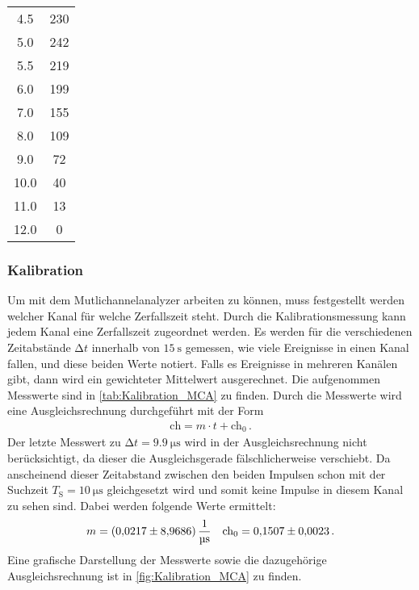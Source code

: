 \begin{table}[h]
\begin{tabular}{S[table-format=2.1] c}
        4.5   &      230\\
        5.0   &      242\\
        5.5   &      219\\
        6.0   &      199\\
        7.0   &      155\\
        8.0   &      109\\
        9.0   &      72 \\
        10.0  &      40 \\
        11.0  &      13 \\
        12.0  &      0  \\
        \bottomrule
      \end{tabular}
    \end{table}
  
  \subsubsection{Kalibration}
  Um mit dem Mutlichannelanalyzer arbeiten zu können, muss festgestellt werden welcher Kanal für welche Zerfallszeit steht.
  Durch die Kalibrationsmessung kann jedem Kanal eine Zerfallszeit zugeordnet werden. Es werden für die verschiedenen Zeitabstände $\increment t$
  innerhalb von $\SI{15}{\second}$ gemessen, wie viele Ereignisse in einen Kanal fallen, und diese beiden Werte notiert. Falls es Ereignisse in mehreren 
  Kanälen gibt, dann wird ein gewichteter Mittelwert ausgerechnet. 
  Die aufgenommen Messwerte sind in \autoref{tab:Kalibration_MCA} zu finden.
  Durch die Messwerte wird eine Ausgleichsrechnung durchgeführt mit der Form
  \begin{align*}
    \text{ch} = m \cdot t + \text{ch}_0 \, .
  \end{align*}
  Der letzte Messwert zu $\increment t = \SI{9.9}{\micro\second}$ wird in der Ausgleichsrechnung nicht berücksichtigt, da dieser die Ausgleichsgerade fälschlicherweise verschiebt.
  Da anscheinend dieser Zeitabstand zwischen den beiden Impulsen schon mit der Suchzeit $T_\text{S} = \SI{10}{\micro\second}$ gleichgesetzt wird und somit keine Impulse in diesem Kanal zu sehen sind.
  Dabei werden folgende Werte ermittelt:
  \begin{align*}
    m = \SI{0.0217 \pm 8.9686}{\per\micro\second} && \text{ch}_0 = \num{0.1507 \pm 0.0023}\, .
  \end{align*}
  Eine grafische Darstellung der Messwerte sowie die dazugehörige Ausgleichsrechnung ist in \autoref{fig:Kalibration_MCA} zu finden.
